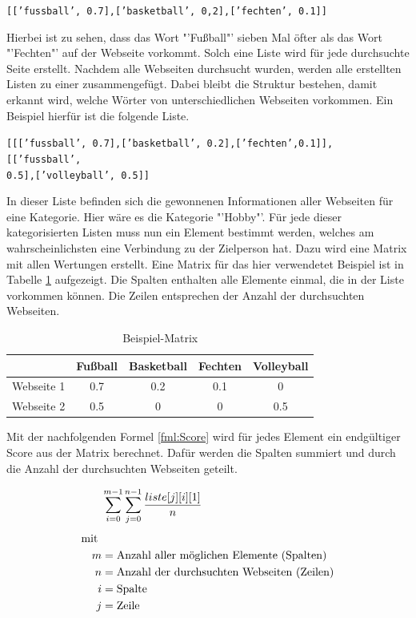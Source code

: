 		\texttt{[['fussball', 0.7],['basketball', 0,2],['fechten', 0.1]]}
		
		Hierbei ist zu sehen, dass das Wort "'Fußball"' sieben Mal öfter als das Wort "'Fechten"' auf der Webseite vorkommt. Solch eine Liste wird für jede durchsuchte Seite erstellt. Nachdem alle Webseiten durchsucht wurden, werden alle erstellten Listen zu einer zusammengefügt. Dabei bleibt die Struktur bestehen, damit erkannt wird, welche Wörter von unterschiedlichen Webseiten vorkommen. Ein Beispiel hierfür ist die folgende Liste.
		
		\texttt{[[['fussball', 0.7],['basketball', 0.2],['fechten',0.1]],
			[['fussball',\\ 0.5],['volleyball', 0.5]]}
		
		In dieser Liste befinden sich die gewonnenen Informationen aller Webseiten für eine Kategorie. Hier wäre es die Kategorie "'Hobby"'. Für jede dieser kategorisierten Listen muss nun ein Element bestimmt werden, welches am wahrscheinlichsten eine Verbindung zu der Zielperson hat. Dazu wird eine Matrix mit allen Wertungen erstellt. Eine Matrix für das hier verwendetet Beispiel ist in Tabelle \ref{img:beispielMatrix} aufgezeigt. Die Spalten enthalten alle Elemente einmal, die in der Liste vorkommen können. Die Zeilen entsprechen der Anzahl der durchsuchten Webseiten. 
		
		\begin{table}[h!]
			\centering
			\begin{tabular}{ | c | c | c |c |c|}
				\hline
				& Fußball & Basketball & Fechten& Volleyball\\ \hline
				Webseite 1& 0.7 & 0.2 & 0.1 & 0\\ \hline
				Webseite 2& 0.5 & 0 & 0 & 0.5\\ \hline
			\end{tabular}
		\label{img:beispielMatrix}
		\caption{Beispiel-Matrix}
		\end{table}
		
		Mit der nachfolgenden Formel \ref{fml:Score} wird für jedes Element ein endgültiger Score aus der Matrix berechnet. Dafür werden die Spalten summiert und durch die Anzahl der durchsuchten Webseiten geteilt.
		
		\begin{align}%
		\label{fml:Score}
		\begin{split}%
		&\sum\limits_{i=0}^{m-1}\sum\limits_{j=0}^{n-1} \frac{liste[j][i][1]}{n}\\[0.25\baselineskip]%
		\text{mit } \\
		m &= \text{Anzahl aller möglichen Elemente (Spalten)}\\
		n &= \text{Anzahl der durchsuchten Webseiten (Zeilen)}\\
		i &= \text{Spalte}\\             %
		j &= \text{Zeile}
		\end{split}
		\end{align}
		

